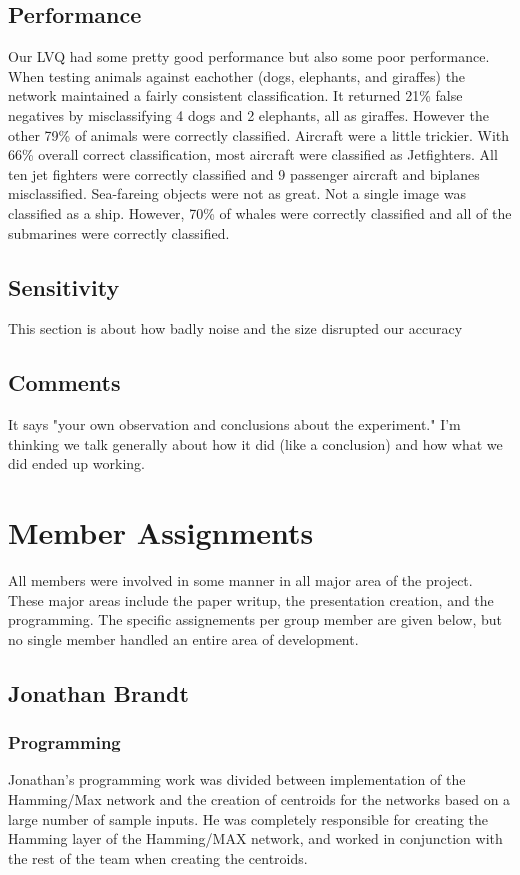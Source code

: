 \documentclass{article}
\begin{document}
\subsection{Performance}
Our LVQ had some pretty good performance but also some poor performance.  When testing animals against eachother (dogs, elephants, and giraffes) the network maintained a fairly consistent classification.  It returned 21\% false negatives by misclassifying 4 dogs and 2 elephants, all as giraffes.  However the other 79\% of animals were correctly classified.  Aircraft were a little trickier.  With 66\% overall correct classification, most aircraft were classified as Jetfighters. All ten jet fighters were correctly classified and 9 passenger aircraft and biplanes misclassified.  Sea-fareing objects were not as great.  Not a single image was classified as a ship.  However, 70\% of whales were correctly classified and all of the submarines were correctly classified.
\begin{itemize}
\end{itemize}

\subsection{Sensitivity}
This section is about how badly noise and the size disrupted our accuracy

\subsection{Comments}
It says "your own observation and conclusions about the experiment."
I'm thinking we talk generally about how it did (like a conclusion) and how
what we did ended up working.

 
\section{Member Assignments}
All members were involved in some manner in all major area of the project. These
major areas include the paper writup, the presentation creation, and the 
programming. The specific assignements per group member are given below, but no
single member handled an entire area of development.
\subsection{Jonathan Brandt}
\subsubsection{Programming}
Jonathan's programming work was divided between implementation of the 
Hamming/Max network and the creation of centroids for the networks based on a
large number of sample inputs. He was completely responsible for creating the Hamming layer of the Hamming/MAX network, and worked in conjunction with the rest of the team when creating the centroids. 
\end{document}
